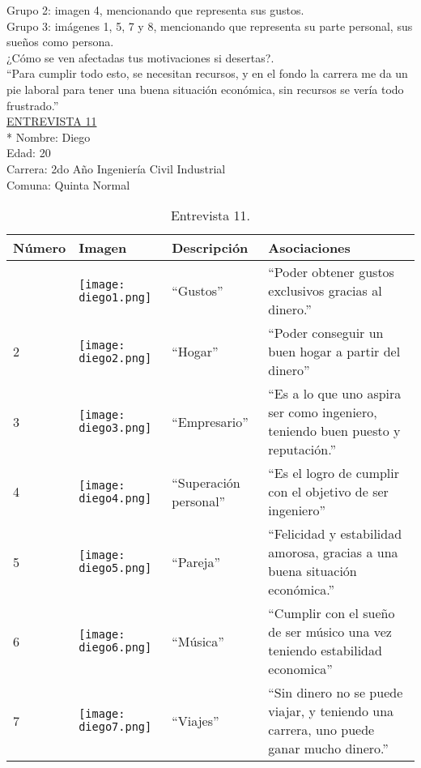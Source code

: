 Grupo 2: imagen 4, mencionando que representa sus gustos.\\

Grupo 3: imágenes 1, 5, 7 y 8, mencionando que representa su parte personal, sus sueños como persona. \\

¿Cómo se ven afectadas tus motivaciones si desertas?.\\

``Para cumplir todo esto, se necesitan recursos, y en el fondo la carrera me da un pie laboral para tener una buena situación económica, sin recursos se vería todo frustrado.'' \\

\newpage
\underline {ENTREVISTA 11}\\*
Nombre: Diego\\
Edad: 20\\
Carrera: 2do Año Ingeniería Civil Industrial\\
Comuna: Quinta Normal\\

\begin{table}[H]
\centering
\begin{tabular}{>{\centering\arraybackslash}m{1cm} >{\centering\arraybackslash}m{2cm} >{\arraybackslash}m{5cm}>{\arraybackslash}m{5cm}}
\hline
Número  & Imagen & Descripción & Asociaciones \\
\hline \hline

1 & \texttt{[image: diego1.png]} & ``Gustos'' & ``Poder obtener gustos exclusivos gracias al dinero.'' \\
\hline

2 & \texttt{[image: diego2.png]} & ``Hogar'' & ``Poder conseguir un buen hogar a partir del dinero'' \\
\hline

3 & \texttt{[image: diego3.png]} & ``Empresario'' & ``Es a lo que uno aspira ser como ingeniero, teniendo buen puesto y reputación.'' \\
\hline

4 & \texttt{[image: diego4.png]} & ``Superación personal'' & ``Es el logro de cumplir con el objetivo de ser ingeniero'' \\
\hline

5 & \texttt{[image: diego5.png]} & ``Pareja'' & ``Felicidad y estabilidad amorosa, gracias a una buena situación económica.'' \\
\hline

6 & \texttt{[image: diego6.png]} & ``Música'' & ``Cumplir con el sueño de ser músico una vez teniendo estabilidad economica'' \\
\hline

7 & \texttt{[image: diego7.png]} & ``Viajes'' & ``Sin dinero no se puede viajar, y teniendo una carrera, uno puede ganar mucho dinero.'' \\
\hline

\end{tabular}
\caption{Entrevista 11.}
\label{tabla:diego}
\end{table}

